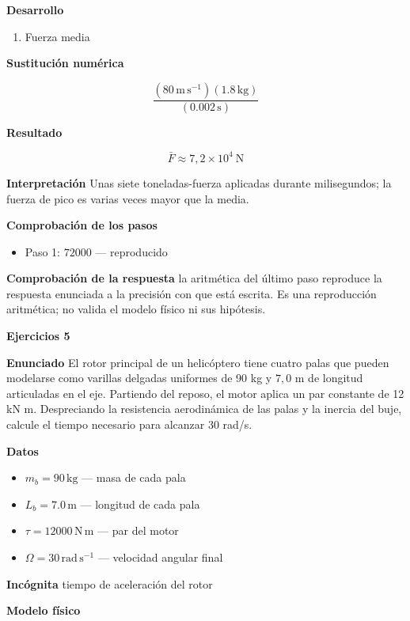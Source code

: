 \documentclass[10pt,openany]{book}
\begin{document}
\noindent\textbf{Desarrollo}
\begin{enumerate}
\item
Fuerza media
\end{enumerate}

\noindent\textbf{Sustitución numérica}

\[
\frac{\left(80\,\mathrm{m}\,\mathrm{s}^{-1}\right) \left(1.8\,\mathrm{kg}\right)}{\left(0.002\,\mathrm{s}\right)}
\]

\noindent\textbf{Resultado}

\[
\bar{F} \approx 7{,}2\times 10^{4}\ \mathrm{N}
\]

\noindent\textbf{Interpretación}
Unas siete toneladas-fuerza aplicadas durante milisegundos; la fuerza de pico es varias veces mayor que la media.

\noindent\textbf{Comprobación de los pasos}
\begin{itemize}
\item Paso 1: $72000$ — reproducido
\end{itemize}

\noindent\textbf{Comprobación de la respuesta} la aritmética del último paso reproduce la respuesta enunciada a la precisión con que está escrita. Es una reproducción aritmética; no valida el modelo físico ni sus hipótesis.

\noindent\textbf{Ejercicios 5}

\noindent\textbf{Enunciado}
El rotor principal de un helicóptero tiene cuatro palas que pueden modelarse como varillas delgadas uniformes de 90 kg y \(7{,}0\) m de longitud articuladas en el eje. Partiendo del reposo, el motor aplica un par constante de 12 kN m. Despreciando la resistencia aerodinámica de las palas y la inercia del buje, calcule el tiempo necesario para alcanzar 30 rad/s.

\noindent\textbf{Datos}
\begin{itemize}
\item $m_{b} = 90\,\mathrm{kg}$ — masa de cada pala
\item $L_{b} = 7.0\,\mathrm{m}$ — longitud de cada pala
\item $\tau = 12000\,\mathrm{N}\,\mathrm{m}$ — par del motor
\item $\Omega = 30\,\mathrm{rad}\,\mathrm{s}^{-1}$ — velocidad angular final
\end{itemize}

\noindent\textbf{Incógnita}
tiempo de aceleración del rotor

\noindent\textbf{Modelo físico}
\end{document}
